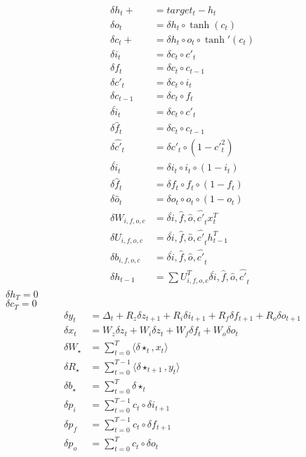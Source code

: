 \documentclass[letterpaper]{article}
\begin{document}
\begin{equation}
\begin{aligned}
\delta h_t +&= target_t - h_t\\
\delta o_t &= \delta h_t \circ \tanh (c_t)\\
\delta c_t +&= \delta h_t \circ o_t \circ \tanh' (c_t)\\
\delta i_t &= \delta c_t \circ c'_t\\
\delta f_t &= \delta c_t \circ c_{t-1}\\
\delta c'_t &= \delta c_t \circ i_t\\
\delta c_{t-1} &= \delta c_t \circ f_t\\
\delta \hat{i}_t &= \delta c_t \circ c'_t\\
\delta \hat{f}_t &= \delta c_t \circ c_{t-1}\\
\delta \hat{c'}_t &= \delta c'_t \circ (1 - c'^2_t)\\
\delta \hat{i}_t &= \delta i_t \circ i_t \circ (1-i_t)\\
\delta \hat{f}_t &= \delta f_t \circ f_t \circ (1-f_t)\\
\delta \hat{o}_t &= \delta o_t \circ o_t \circ (1-o_t)\\
\delta W_{i,f,o,c} &= \delta {\hat{i},\hat{f},\hat{o},\hat{c'}}_t x^T_t\\
\delta U_{i,f,o,c} &= \delta {\hat{i},\hat{f},\hat{o},\hat{c'}}_t h^T_{t-1}\\
\delta b_{i,f,o,c} &= \delta {\hat{i},\hat{f},\hat{o},\hat{c'}}_t\\
\delta h_{t-1} &= \sum U_{i,f,o,c}^T\delta {\hat{i},\hat{f},\hat{o},\hat{c'}}_t\\
\end{aligned}
\end{equation}
$\delta h_{T} = 0$\\
$\delta c_{T} = 0$\\

\begin{equation}
\begin{aligned}
\delta y_t &= \Delta_t + R_z\delta z_{t+1} + R_i\delta i_{t+1} + R_f\delta f_{t+1} + R_o\delta o_{t+1}\\
\delta x_t &= W_z\delta z_{t} + W_i\delta z_{t} + W_f\delta f_{t} + W_o\delta o_{t}\\
\delta W_{\star} &= \sum^T_{t=0} \langle \delta\star_t,x_t\rangle\\
\delta R_{\star} &= \sum^{T-1}_{t=0} \langle \delta\star_{t+1},y_t\rangle\\
\delta b_{\star} &= \sum^{T}_{t=0} \delta\star_{t}\\
\delta p_{i} &= \sum^{T-1}_{t=0} c_t \circ \delta i_{t+1}\\
\delta p_{f} &= \sum^{T-1}_{t=0} c_t \circ \delta f_{t+1}\\
\delta p_{o} &= \sum^{T}_{t=0} c_t \circ \delta o_{t}\\
\end{aligned}
\end{equation}
\end{document}
